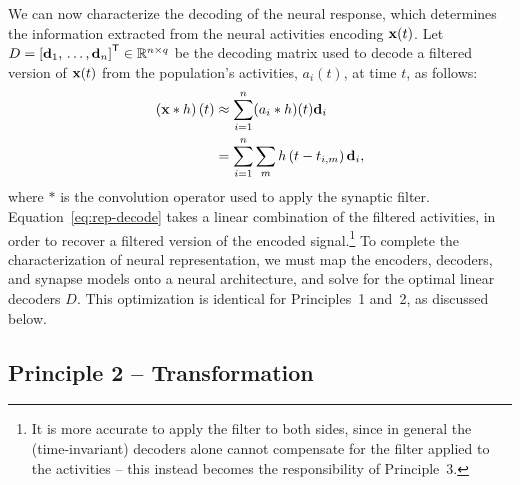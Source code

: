 We can now characterize the decoding of the neural response, which determines the information extracted from the neural activities encoding $\mathbf{x}(t)$.
Let $D = {\left[ \mathbf{d}_1\text{,}\, \ldots\text{,}\, \mathbf{d}_n \right]}^\mathsf{T} \in \mathbb{R}^{n \times q}$ be the decoding matrix used to decode a filtered version of $\mathbf{x}(t)$ from the population's activities, $a_i(t)$, at time $t$, as follows:
\begin{equation} \label{eq:rep-decode}
\begin{aligned}
\left(\mathbf{x} \ast h \right)(t) &\approx \sum_{i=1}^n (a_i \ast h)(t) \mathbf{d}_i \\
&= \sum_{i=1}^n \sum_m h \left(t - t_{i\text{,}m} \right) \mathbf{d}_i \text{,}
\end{aligned}
\end{equation}
where $\ast$ is the convolution operator used to apply the synaptic filter.
Equation~\ref{eq:rep-decode} takes a linear combination of the filtered activities, in order to recover a filtered version of the encoded signal.\footnote{It is more accurate to apply the filter to both sides, since in general the (time-invariant) decoders alone cannot compensate for the filter applied to the activities -- this instead becomes the responsibility of Principle~3.}
To complete the characterization of neural representation, we must map the encoders, decoders, and synapse models onto a neural architecture, and solve for the optimal linear decoders $D$.
This optimization is identical for Principles~1 and~2, as discussed below.

\subsection{Principle 2 -- Transformation}
\label{sec:principle2}

